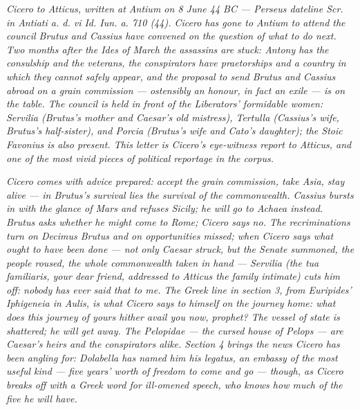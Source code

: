 
\textit{Cicero to Atticus, written at Antium on 8 June 44 BC ---
Perseus dateline \textit{Scr. in Antiati a. d. vi Id. Iun. a. 710
(44)}. Cicero has gone to Antium to attend the council Brutus
and Cassius have convened on the question of what to do next.
Two months after the Ides of March the assassins are stuck:
Antony has the consulship and the veterans, the conspirators
have praetorships and a country in which they cannot safely
appear, and the proposal to send Brutus and Cassius abroad on a
grain commission --- ostensibly an honour, in fact an exile ---
is on the table. The council is held in front of the Liberators'
formidable women: Servilia (Brutus's mother and Caesar's old
mistress), Tertulla (Cassius's wife, Brutus's half-sister), and
Porcia (Brutus's wife and Cato's daughter); the Stoic Favonius
is also present. This letter is Cicero's eye-witness report to
Atticus, and one of the most vivid pieces of political reportage
in the corpus.}

\textit{Cicero comes with advice prepared: accept the grain
commission, take Asia, stay alive --- in Brutus's survival lies
the survival of the commonwealth. Cassius bursts in with the
glance of Mars and refuses Sicily; he will go to Achaea instead.
Brutus asks whether he might come to Rome; Cicero says no. The
recriminations turn on Decimus Brutus and on opportunities
missed; when Cicero says what ought to have been done --- not
only Caesar struck, but the Senate summoned, the people roused,
the whole commonwealth taken in hand --- Servilia (the
\textit{tua familiaris}, your dear friend, addressed to Atticus
the family intimate) cuts him off: \textit{nobody has ever said
that to me}. The Greek line in section 3, from Euripides'
\textit{Iphigeneia in Aulis}, is what Cicero says to himself on
the journey home: \textit{what does this journey of yours hither
avail you now, prophet?} The vessel of state is shattered; he
will get away. The Pelopidae --- the cursed house of Pelops ---
are Caesar's heirs and the conspirators alike. Section 4 brings
the news Cicero has been angling for: Dolabella has named him
his \textit{legatus}, an embassy of the most useful kind ---
five years' worth of freedom to come and go --- though, as Cicero
breaks off with a Greek word for ill-omened speech, who knows
how much of the five he will have.}
